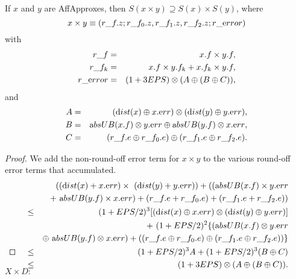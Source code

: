 \begin{proposition}\label{GMT 8.6} If $x$ and $y$ are 
{\textrm AffApproxes,}
then $S(x \times y) \supseteq S(x) \times S(y)${\textrm ,} where
$$x \times y \equiv (r\_f.z; r\_f_0.z, r\_f_1.z, r\_f_2.z; r\_{\textrm error})$$
with
\begin{eqnarray*}
r\_f &=& x.f \times y.f,\\
r\_f_k &=& x.f \times y.f_k + x.f_k \times y.f,\\
r\_{\textrm error} &=& 
(1 + 3EPS) \otimes (A \oplus (B \oplus C)),\end{eqnarray*}
and
\begin{eqnarray*}
A &=& ({\textrm dist}(x) \oplus x.{\textrm err})\otimes ({\textrm dist}(y) \oplus y.{\textrm err}),
\\
B& =& {\textrm absUB}(x.f) \otimes
y.{\textrm err} \oplus {\textrm absUB}(y.f) \otimes x.{\textrm err},\\
C& =& (r\_f.e \oplus r\_f_0.e) \oplus (r\_f_1.e \oplus
r\_f_2.e).\end{eqnarray*}
\end{proposition}

\begin{proof}{}
We add the non-round-off error term for $x \times y$ to the various round-off error terms that accumulated.
\begin{eqnarray*}
&&\hskip-48pt (({\textrm dist}(x) + x.{\textrm err}) \times\ ({\textrm dist}(y) + y.{\textrm err})) +
 (({\textrm absUB}(x.f) \times y.{\textrm err} 
\\
&& +\ 
{\textrm absUB}(y.f) \times x.{\textrm err}) +
 (r\_f.e + r\_f_0.e) + (r\_f_1.e + r\_f_2.e))
\\
&\le& 
(1+EPS/2)^3[({\textrm dist}(x) \oplus x.{\textrm err})\otimes ({\textrm dist}(y) \oplus y.{\textrm err})]\\
&& +\
 (1+EPS/2)^2\{({\textrm absUB}(x.f) \otimes y.{\textrm err} 
\\
& &\oplus\ 
{\textrm absUB}(y.f) \otimes x.{\textrm err}) +
((r\_f.e \oplus r\_f_0.e) \oplus (r\_f_1.e \oplus r\_f_2.e))\}
\\
&\le& (1+EPS/2)^3 A + (1+EPS/2)^3 (B \oplus C) \\
&\le& (1+3EPS) \otimes (A \oplus (B \oplus C) ). \\
\noalign{\vskip-36pt}
\end{eqnarray*}
\end{proof}

$X \times D$: 

